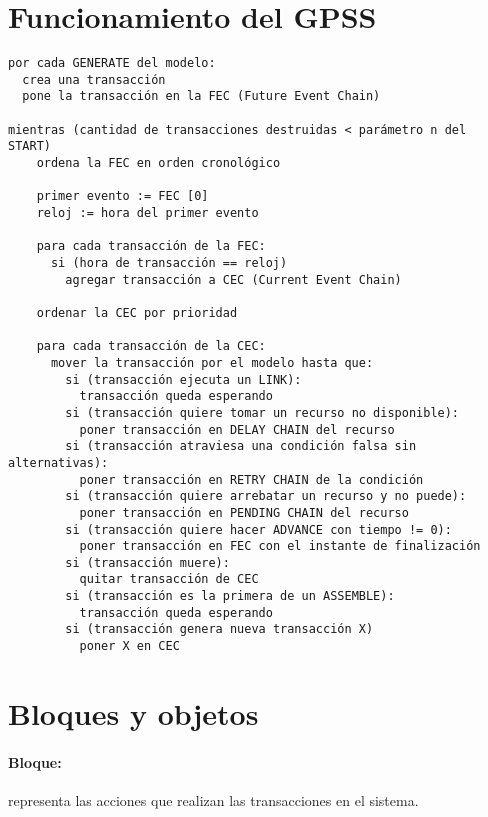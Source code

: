 \documentclass[12pt, a4paper, twoside]{paquetes-apunte/apunte}
\begin{document}
\section{Funcionamiento del GPSS}

\begin{lstlisting}
por cada GENERATE del modelo:
  crea una transacción
  pone la transacción en la FEC (Future Event Chain)

mientras (cantidad de transacciones destruidas < parámetro n del START)
    ordena la FEC en orden cronológico

    primer evento := FEC [0]
    reloj := hora del primer evento

    para cada transacción de la FEC:
      si (hora de transacción == reloj)
        agregar transacción a CEC (Current Event Chain)

    ordenar la CEC por prioridad

    para cada transacción de la CEC:
      mover la transacción por el modelo hasta que:
        si (transacción ejecuta un LINK):
          transacción queda esperando
        si (transacción quiere tomar un recurso no disponible):
          poner transacción en DELAY CHAIN del recurso
        si (transacción atraviesa una condición falsa sin alternativas):
          poner transacción en RETRY CHAIN de la condición
        si (transacción quiere arrebatar un recurso y no puede):
          poner transacción en PENDING CHAIN del recurso
        si (transacción quiere hacer ADVANCE con tiempo != 0):
          poner transacción en FEC con el instante de finalización
        si (transacción muere):
          quitar transacción de CEC
        si (transacción es la primera de un ASSEMBLE):
          transacción queda esperando
        si (transacción genera nueva transacción X)
          poner X en CEC
\end{lstlisting}


\section{Bloques y objetos}

\paragraph{Bloque:} representa las acciones que realizan las transacciones
en el sistema.
\end{document}

